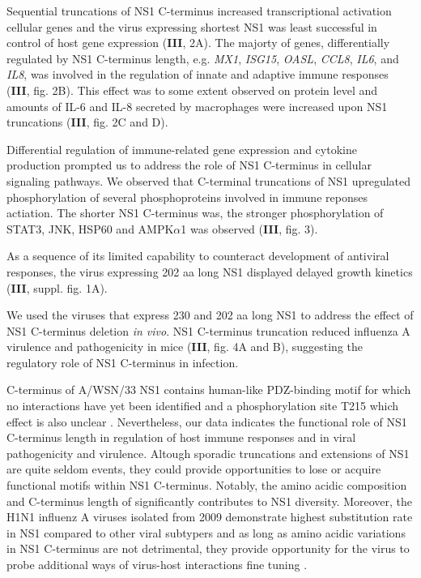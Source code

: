 		Sequential truncations of NS1 C-terminus increased transcriptional activation cellular genes and the virus expressing shortest NS1 was least successful in control of host gene expression (\textbf{III}, 2A). The majorty of genes, differentially regulated by NS1 C-terminus length, e.g. \textit{MX1}, \textit{ISG15}, \textit{OASL}, \textit{CCL8}, \textit{IL6}, and \textit{IL8}, was involved in the regulation of innate and adaptive immune responses (\textbf{III}, fig. 2B).  This effect was to some extent observed on protein level and amounts of IL-6 and IL-8 secreted by macrophages were increased upon NS1 truncations (\textbf{III}, fig. 2C and D). 
		
		Differential regulation of immune-related gene expression and cytokine production prompted us to address the role of NS1 C-terminus in cellular signaling pathways. We observed that C-terminal truncations of NS1 upregulated phosphorylation of several phosphoproteins involved in immune reponses actiation. The shorter NS1 C-terminus was, the stronger phosphorylation of STAT3, JNK, HSP60 and AMPK$\alpha$1 was observed (\textbf{III}, fig. 3). 
		
		As a sequence of its limited capability to counteract development of antiviral responses, the virus expressing 202 aa long NS1 displayed delayed growth kinetics (\textbf{III}, suppl. fig. 1A).
		
		We used the viruses that express 230 and 202 aa long NS1 to address the effect of NS1 C-terminus deletion \textit{in vivo}. NS1 C-terminus truncation reduced influenza A virulence and pathogenicity in mice (\textbf{III}, fig. 4A and B), suggesting the regulatory role of NS1 C-terminus in infection.
		
		C-terminus of A/WSN/33 NS1 contains human-like PDZ-binding motif for which no interactions have yet been identified and a phosphorylation site T215 which effect is also unclear \parencite{Jackson2010, Hsiang2012}. Nevertheless, our data indicates the functional role of NS1 C-terminus length in regulation of host immune responses and in viral pathogenicity and virulence. Altough sporadic truncations and extensions of NS1 are quite seldom events, they could provide opportunities to lose or acquire functional motifs within NS1 C-terminus. Notably, the amino acidic composition and C-terminus length of significantly contributes to NS1 diversity. Moreover, the H1N1 influenz A viruses isolated from 2009 demonstrate highest substitution rate in NS1 compared to other viral subtypers and as long as amino acidic variations in NS1 C-terminus are not detrimental, they provide opportunity for the virus to probe additional ways of virus-host interactions fine tuning \parencite{Xu2011}. 
		 
